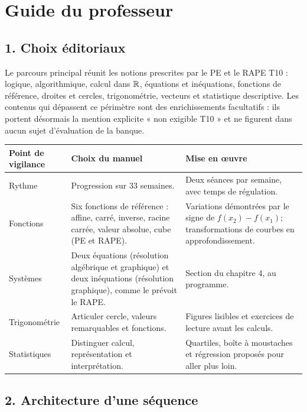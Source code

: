 \chapter*{Guide du professeur}

\section*{1. Choix éditoriaux}

Le parcours principal réunit les notions prescrites par le PE et le RAPE T10 :
logique, algorithmique, calcul dans $\mathbb{R}$, équations et inéquations, fonctions de
référence, droites et cercles, trigonométrie, vecteurs et statistique descriptive.
Les contenus qui dépassent ce périmètre sont des enrichissements facultatifs :
ils portent désormais la mention explicite « non exigible T10 » et ne figurent
dans aucun sujet d'évaluation de la banque.

\begin{center}
\small
\begin{tabularx}{\textwidth}{@{}p{3.2cm}X X@{}}
\toprule
Point de vigilance & Choix du manuel & Mise en œuvre \\
\midrule
Rythme & Progression sur 33 semaines. & Deux séances par semaine, avec temps de régulation. \\
Fonctions & Six fonctions de référence : affine, carré, inverse, racine carrée, valeur absolue, cube (PE et RAPE). &
Variations démontrées par le signe de $f(x_2)-f(x_1)$; transformations de courbes en approfondissement. \\
Systèmes & Deux équations (résolution algébrique et graphique) et deux inéquations (résolution graphique), comme le prévoit le RAPE. &
Section du chapitre 4, au programme. \\
Trigonométrie & Articuler cercle, valeurs remarquables et fonctions. &
Figures lisibles et exercices de lecture avant les calculs. \\
Statistiques & Distinguer calcul, représentation et interprétation. &
Quartiles, boîte à moustaches et régression proposés pour aller plus loin. \\
\bottomrule
\end{tabularx}
\end{center}

\section*{2. Architecture d'une séquence}

